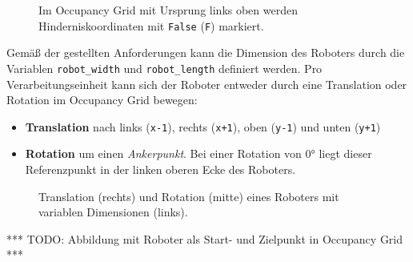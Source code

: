 \begin{figure}[h!]
\begin{minipage}{0.46\textwidth}
	\end{minipage}
	\caption{Im Occupancy Grid mit Ursprung links oben werden Hinderniskoordinaten mit \texttt{False} (\texttt{F}) markiert.}
\end{figure}

Gemäß der gestellten Anforderungen kann die Dimension des Roboters durch die Variablen \texttt{robot\_width} und \texttt{robot\_length} definiert werden. Pro Verarbeitungseinheit kann sich der Roboter entweder durch eine Translation oder Rotation im Occupancy Grid bewegen:
\begin{itemize}
\item \textbf{Translation} nach links (\texttt{x-1}), rechts (\texttt{x+1}), oben (\texttt{y-1}) und unten (\texttt{y+1})
\item \textbf{Rotation} um einen \textit{Ankerpunkt}. Bei einer Rotation von $0$° liegt dieser Referenzpunkt in der linken oberen Ecke des Roboters.
\end{itemize}

\begin{figure}[h!]
	\centering
	\small
	\centerline{\resizebox{\linewidth}{!}{}}
	\caption{Translation (rechts) und Rotation (mitte) eines Roboters mit variablen Dimensionen (links).}
\end{figure}

*** TODO: Abbildung mit Roboter als Start- und Zielpunkt in Occupancy Grid ***